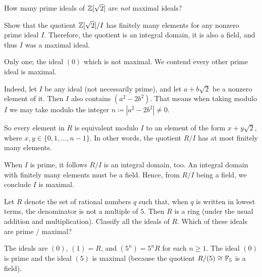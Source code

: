 \begin{dproblem}
	How many prime ideals of $\mathbb Z[\sqrt 2]$ are \emph{not} maximal ideals?
	\label{prob:dedekind_sample}
	\begin{hint}
		Show that the quotient $\mathbb Z[\sqrt2]/I$ has finitely many elements
		for any nonzero prime ideal $I$.
		Therefore, the quotient is an integral domain, it is also a field,
		and thus $I$ was a maximal ideal.
	\end{hint}
	\begin{sol}
		Only one; the ideal $(0)$ which is not maximal.
		We contend every other prime ideal is maximal.

		Indeed, let $I$ be any ideal (not necessarily prime),
		and let $a + b \sqrt 2$ be a nonzero element of it.
		Then $I$ also contains $(a^2-2b^2)$.
		That means when taking modulo $I$ we may take modulo the integer
		$n \coloneqq |a^2-2b^2| \neq 0$.

		So every element in $R$ is equivalent modulo $I$
		to an element of the form $x + y \sqrt 2$,
		where $x,y \in \{0, 1, \dots, n-1\}$.
		In other words, the quotient $R/I$ has at most finitely many elements.

		When $I$ is prime, it follows $R/I$ is an integral domain, too.
		An integral domain with finitely many elements must be a field.
		Hence, from $R/I$ being a field, we conclude $I$ is maximal.
	\end{sol}
\end{dproblem}

\begin{problem}
	Let $R$ denote the set of rational numbers $q$ such that,
	when $q$ is written in lowest terms, the denominator is not a multiple of $5$.
	Then $R$ is a ring (under the usual addition and multiplication).
	Classify all the ideals of $R$.
	Which of these ideals are prime / maximal?
	\begin{sol}
		The ideals are $(0)$, $(1) = R$, and $(5^n) = 5^n R$ for each $n \ge 1$.
		The ideal $(0)$ is prime and the ideal $(5)$ is maximal
		(because the quotient $R/(5) \cong \mathbb F_5$ is a field).
	\end{sol}
\end{problem}

